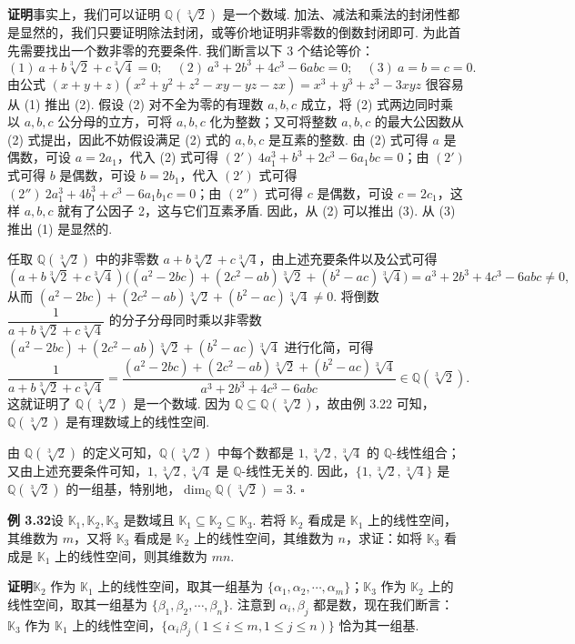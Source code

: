 \documentclass[UTF8, 12pt, fontset=fandol, oneside]{ctexart}
\begin{document}
\noindent\textbf{证明}\quad 事实上，我们可以证明 $\mathbb{Q}(\sqrt[3]{2})$ 是一个数域. 加法、减法和乘法的封闭性都是显然的，我们只要证明除法封闭，或等价地证明非零数的倒数封闭即可. 为此首先需要找出一个数非零的充要条件. 我们断言以下 3 个结论等价：
\[
(1)\ a+b\sqrt[3]{2}+c\sqrt[3]{4}=0;\quad
(2)\ a^3+2b^3+4c^3-6abc=0;\quad
(3)\ a=b=c=0.
\]
由公式 $(x+y+z)(x^2+y^2+z^2-xy-yz-zx)=x^3+y^3+z^3-3xyz$ 很容易从 (1) 推出 (2). 假设 (2) 对不全为零的有理数 $a,b,c$ 成立，将 (2) 式两边同时乘以 $a,b,c$ 公分母的立方，可将 $a,b,c$ 化为整数；又可将整数 $a,b,c$ 的最大公因数从 (2) 式提出，因此不妨假设满足 (2) 式的 $a,b,c$ 是互素的整数. 由 (2) 式可得 $a$ 是偶数，可设 $a=2a_1$，代入 (2) 式可得 $(2')\ 4a_1^3+b^3+2c^3-6a_1bc=0$；由 $(2')$ 式可得 $b$ 是偶数，可设 $b=2b_1$，代入 $(2')$ 式可得 $(2'')\ 2a_1^3+4b_1^3+c^3-6a_1b_1c=0$；由 $(2'')$ 式可得 $c$ 是偶数，可设 $c=2c_1$，这样 $a,b,c$ 就有了公因子 2，这与它们互素矛盾. 因此，从 (2) 可以推出 (3). 从 (3) 推出 (1) 是显然的.

任取 $\mathbb{Q}(\sqrt[3]{2})$ 中的非零数 $a+b\sqrt[3]{2}+c\sqrt[3]{4}$，由上述充要条件以及公式可得
\[
(a+b\sqrt[3]{2}+c\sqrt[3]{4})\bigl((a^2-2bc)+(2c^2-ab)\sqrt[3]{2}+(b^2-ac)\sqrt[3]{4}\bigr)
=a^3+2b^3+4c^3-6abc\ne 0,
\]
从而 $(a^2-2bc)+(2c^2-ab)\sqrt[3]{2}+(b^2-ac)\sqrt[3]{4}\ne 0$. 将倒数 $\dfrac{1}{a+b\sqrt[3]{2}+c\sqrt[3]{4}}$ 的分子分母同时乘以非零数 $(a^2-2bc)+(2c^2-ab)\sqrt[3]{2}+(b^2-ac)\sqrt[3]{4}$ 进行化简，可得
\[
\frac{1}{a+b\sqrt[3]{2}+c\sqrt[3]{4}}
=\frac{(a^2-2bc)+(2c^2-ab)\sqrt[3]{2}+(b^2-ac)\sqrt[3]{4}}{a^3+2b^3+4c^3-6abc}
\in\mathbb{Q}(\sqrt[3]{2}).
\]
这就证明了 $\mathbb{Q}(\sqrt[3]{2})$ 是一个数域. 因为 $\mathbb{Q}\subseteq\mathbb{Q}(\sqrt[3]{2})$，故由例 3.22 可知，$\mathbb{Q}(\sqrt[3]{2})$ 是有理数域上的线性空间.

由 $\mathbb{Q}(\sqrt[3]{2})$ 的定义可知，$\mathbb{Q}(\sqrt[3]{2})$ 中每个数都是 $1,\sqrt[3]{2},\sqrt[3]{4}$ 的 $\mathbb{Q}$-线性组合；又由上述充要条件可知，$1,\sqrt[3]{2},\sqrt[3]{4}$ 是 $\mathbb{Q}$-线性无关的. 因此，$\{1,\sqrt[3]{2},\sqrt[3]{4}\}$ 是 $\mathbb{Q}(\sqrt[3]{2})$ 的一组基，特别地，$\dim_{\mathbb{Q}}\mathbb{Q}(\sqrt[3]{2})=3$. $\square$

\noindent\textbf{例 3.32}\quad 设 $\mathbb{K}_1,\mathbb{K}_2,\mathbb{K}_3$ 是数域且 $\mathbb{K}_1\subseteq\mathbb{K}_2\subseteq\mathbb{K}_3$. 若将 $\mathbb{K}_2$ 看成是 $\mathbb{K}_1$ 上的线性空间，其维数为 $m$，又将 $\mathbb{K}_3$ 看成是 $\mathbb{K}_2$ 上的线性空间，其维数为 $n$，求证：如将 $\mathbb{K}_3$ 看成是 $\mathbb{K}_1$ 上的线性空间，则其维数为 $mn$.

\noindent\textbf{证明}\quad $\mathbb{K}_2$ 作为 $\mathbb{K}_1$ 上的线性空间，取其一组基为 $\{\alpha_1,\alpha_2,\cdots,\alpha_m\}$；$\mathbb{K}_3$ 作为 $\mathbb{K}_2$ 上的线性空间，取其一组基为 $\{\beta_1,\beta_2,\cdots,\beta_n\}$. 注意到 $\alpha_i,\beta_j$ 都是数，现在我们断言：$\mathbb{K}_3$ 作为 $\mathbb{K}_1$ 上的线性空间，$\{\alpha_i\beta_j(1\le i\le m,1\le j\le n)\}$ 恰为其一组基.
\end{document}
